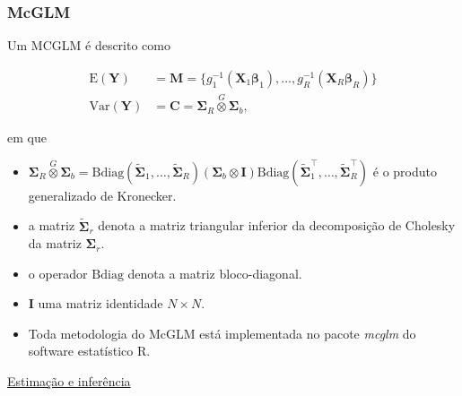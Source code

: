 \documentclass[10pt,
  aspectratio=169,
  serif,
  mathserif,
  professionalfont,
  compress,
  handout,
  ]{beamer}\usepackage[]{graphicx}\usepackage[]{color}
\begin{document}
\begin{frame}
  \frametitle{McGLM}
  
  Um MCGLM é descrito como

\begin{equation}
\label{eq:mcglm}
      \begin{aligned}
        \mathrm{E}(\boldsymbol{Y}) &=
          \boldsymbol{M} =
            \{g_1^{-1}(\boldsymbol{X}_1 \boldsymbol{\beta}_1),
            \ldots,
            g_R^{-1}(\boldsymbol{X}_R \boldsymbol{\beta}_R)\}
          \\
        \mathrm{Var}(\boldsymbol{Y}) &=
          \boldsymbol{C} =
            \boldsymbol{\Sigma}_R \overset{G} \otimes
            \boldsymbol{\Sigma}_b,
      \end{aligned}
\end{equation}

em que 
  
  \begin{itemize}
    
    \itemsep 0.5ex
    
  \item $\boldsymbol{\Sigma}_R \overset{G} \otimes \boldsymbol{\Sigma}_b = \mathrm{Bdiag}(\tilde{\boldsymbol{\Sigma}}_1, \ldots, \tilde{\boldsymbol{\Sigma}}_R) (\boldsymbol{\Sigma}_b \otimes \boldsymbol{I}) \mathrm{Bdiag}(\tilde{\boldsymbol{\Sigma}}_1^\top, \ldots, \tilde{\boldsymbol{\Sigma}}_R^\top)$ é o produto generalizado de Kronecker. 
  
  \item a matriz $\tilde{\boldsymbol{\Sigma}}_r$ denota a matriz triangular inferior da decomposição de Cholesky da matriz ${\boldsymbol{\Sigma}}_r$. 
  
  \item o operador $\mathrm{Bdiag}$ denota a matriz bloco-diagonal. 
  
  \item $\boldsymbol{I}$ uma matriz identidade $N \times N$.
  
  \item Toda metodologia do McGLM está implementada no pacote \emph{mcglm} \cite{mcglm} do software estatístico R.

  \end{itemize}
  
\end{frame}


\begin{frame}[c, allowframebreaks]

\begin{center}

  {\normalsize \href{https://lineu96.github.io/st/}{Estimação e inferência}}
  
\end{center}

\end{frame}
\end{document}
